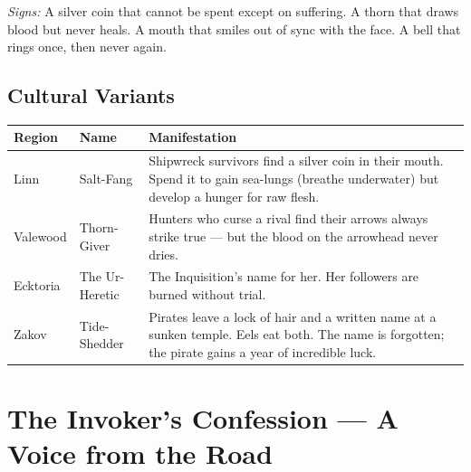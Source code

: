 \documentclass[10pt,twoside]{book}
\begin{document}
\textit{Signs:} A silver coin that cannot be spent except on suffering. A thorn that draws blood but never heals. A mouth that smiles out of sync with the face. A bell that rings once, then never again.

\section{Cultural Variants}
\begin{tabular}{@{}p{}p{}p{}@{}}
\toprule
\textbf{Region} & \textbf{Name} & \textbf{Manifestation} \\
\midrule
Linn & Salt-Fang & Shipwreck survivors find a silver coin in their mouth. Spend it to gain sea-lungs (breathe underwater) but develop a hunger for raw flesh. \\
Valewood & Thorn-Giver & Hunters who curse a rival find their arrows always strike true --- but the blood on the arrowhead never dries. \\
Ecktoria & The Ur-Heretic & The Inquisition's name for her. Her followers are burned without trial. \\
Zakov & Tide-Shedder & Pirates leave a lock of hair and a written name at a sunken temple. Eels eat both. The name is forgotten; the pirate gains a year of incredible luck. \\
\bottomrule
\end{tabular}

\chapter{The Invoker's Confession --- A Voice from the Road}
\end{document}
